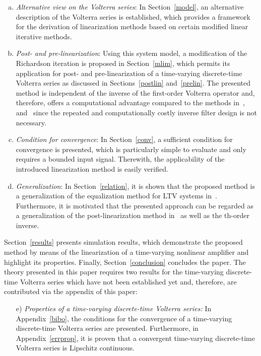 \documentclass[10pt,twocolumn,twoside]{IEEEtran}
\begin{document}
\begin{enumerate}[a)]
	\item \emph{Alternative view on the Volterra series}: In Section~\ref{model}, an
		alternative description of the Volterra series
		is established, which provides a framework for the derivation of linearization
		methods based on certain modified linear iterative methods.
	\item \emph{Post- and pre-linearization}: Using this system model,
		a modification of the Richardson iteration is proposed in Section~\ref{mlim}, which permits its
		application for post- and pre-linearization of a time-varying
		discrete-time Volterra series as discussed in Sections~\ref{postlin} and~\ref{prelin}.
		The presented method is independent of the inverse of the first-order Volterra operator
		and, therefore, offers a computational advantage compared to the methods
		in~\cite{schetzen1976,sarti1992}, and~\cite{nowak1997} since the repeated and
		computationally costly inverse filter design is not necessary.
	\item \emph{Condition for convergence}: In Section~\ref{conv}, a sufficient condition
		for convergence is presented, which is particularly simple to evaluate and only requires
		a bounded input signal. Therewith, the applicability of the introduced linearization
		method is easily verified.
	\item \emph{Generalization}: In Section~\ref{relation}, it is shown that the
		proposed method is a generalization of the equalization
		method for LTV systems in~\cite{soudan2012}.
		Furthermore, it is motivated that the presented approach can be regarded as a generalization
		of the post-linearization method in~\cite{nowak1997} as well as the th-order inverse.
\end{enumerate}
Section~\ref{results} presents simulation results, which demonstrate the
proposed method by means of the linearization of a time-varying nonlinear amplifier
and highlight its properties.
Finally, Section~\ref{conclusion} concludes the paper. The theory presented in this
paper requires two results for the time-varying discrete-time Volterra series which
have not been established yet and, therefore, are contributed via the appendix of
this paper:
\begin{enumerate}
	\item[e)] \emph{Properties of a time-varying discrete-time Volterra series:}
		In Appendix~\ref{bibo}, the conditions for the convergence
		of a time-varying discrete-time Volterra series are presented.
		Furthermore, in Appendix~\ref{errprop}, it is proven that a convergent time-varying discrete-time
		Volterra series is Lipschitz continuous.
\end{enumerate}
\end{document}
